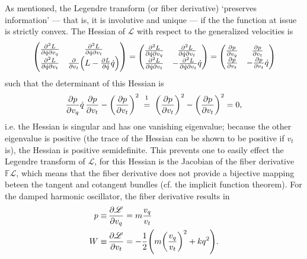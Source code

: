 As mentioned, the Legendre transform (or fiber derivative) `preserves information' --- that is, it is involutive and unique --- if the the function at issue is strictly convex. The Hessian of $\mathscr{L}$ with respect to the generalized velocities is
$$ \mqty(\pdv[2]{L}{\dot{q}}{v_q} & \pdv[2]{L}{\dot{q}}{v_t} \\ \pdv[2]{L}{\dot{q}}{v_t} & \pdv{}{v_t}\qty(L - \pdv{L}{\dot{q}}\dot{q}) ) = \mqty(\pdv[2]{L}{\dot{q}}{v_q} & \pdv[2]{L}{\dot{q}}{v_t} \\ \pdv[2]{L}{\dot{q}}{v_t} & -\pdv[2]{L}{\dot{q}}{v_t}\dot{q}) = \mqty(\pdv{p}{v_q} & \pdv{p}{v_t} \\ \pdv{p}{v_t} & -\pdv{p}{v_t}\dot{q}) $$
such that the determinant of this Hessian is
$$ \pdv{p}{v_q}\dot{q}\,\pdv{p}{v_t} - \qty(\pdv{p}{v_t})^2\; \stackrel{\footnotemark}{=}\; \qty(\pdv{p}{v_t})^2 - \qty(\pdv{p}{v_t})^2 = 0, $$
i.e. the Hessian is singular and has one vanishing eigenvalue; because the other eigenvalue is positive (the trace of the Hessian can be shown to be positive if $v_t$ is), the Hessian is positive semidefinite. This prevents one to easily effect the Legendre transform of $\mathscr{L}$, for this Hessian is the Jacobian of the fiber derivative $\mathbb{F}\mathscr{L}$, which means that the fiber derivative does not provide a bijective mapping beteen the tangent and cotangent bundles (cf. the implicit function theorem). For the damped harmonic oscillator, the fiber derivative results in
\begin{equation}
    \begin{split}
        p \equiv&\,\pdv{\mathscr{L}}{v_q} = m\frac{v_q}{v_t} \\
        W \equiv&\,\pdv{\mathscr{L}}{v_t} = -\frac{1}{2}\qty(m\qty(\frac{v_q}{v_t})^2 + kq^2).
    \end{split}
    \label{eq:fiber_derivative_dho}
\end{equation}

